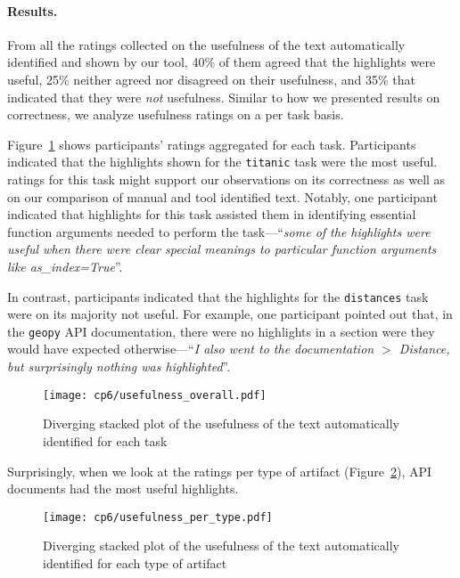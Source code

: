 

\paragraph{\textbf{Results.}}


From all the ratings collected on the  usefulness of the text automatically identified and shown by our tool, 40\% of them agreed that the highlights were useful, 
25\% neither agreed nor disagreed on their usefulness, and 35\% that indicated that they were \textit{not} usefulness.
Similar to how we presented results on correctness, we analyze usefulness ratings on a per task basis.  




Figure~\ref{fig:usefulness-by-task} shows participants' ratings aggregated for each task. 
Participants indicated that the highlights shown for the \texttt{titanic} task were the most useful. 
ratings for this task might support our observations on its correctness as well as on our comparison of manual and tool identified text. 
Notably, one participant indicated that highlights for this task assisted them in identifying essential function arguments needed to perform the task---``\textit{some of the highlights were useful when there were clear special meanings to particular function arguments like as\_index=True}''.


In contrast, participants indicated that the highlights for the \texttt{distances} task were on its majority not useful. 
For example, one participant pointed out that, in the \texttt{geopy} API documentation, there were no highlights in 
a section were they would have expected otherwise---``\textit{I also went to the documentation $>$ Distance, but surprisingly nothing was highlighted}''.




\begin{figure}
    \centering
    \texttt{[image: cp6/usefulness\_overall.pdf]}
    \caption{Diverging stacked plot of the usefulness of the text automatically identified for each task}
    \label{fig:usefulness-by-task}
\end{figure}




Surprisingly, when we look at the ratings per type of artifact (Figure~\ref{fig:usefulness-by-artifact-type}), API documents had the most useful highlights.






\begin{figure}
    \centering
    \texttt{[image: cp6/usefulness\_per\_type.pdf]}
    \caption{Diverging stacked plot of the usefulness of the text automatically identified for each type of artifact}
    \label{fig:usefulness-by-artifact-type}
\end{figure}









